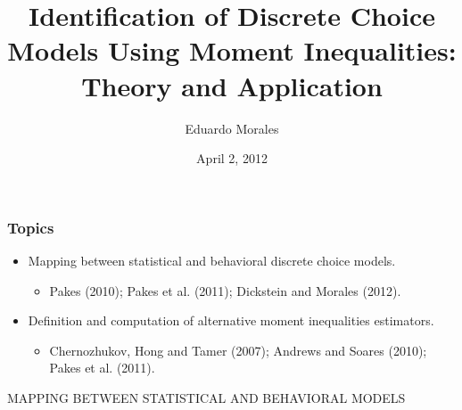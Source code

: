\title[]{Identification of Discrete Choice Models Using Moment Inequalities:\\Theory and Application}

\author[Morales] {Eduardo Morales}
\date[]{April 2, 2012}




\begin{frame}[plain]
  \titlepage
\end{frame}
\begin{frame}
\frametitle{Topics}

\begin{itemize}
	\item Mapping between statistical and behavioral discrete choice models.
	\begin{itemize}
		\item Pakes (2010); Pakes et al. (2011); Dickstein and Morales (2012).
	\end{itemize}
	\item Definition and computation of alternative moment inequalities estimators.
	\begin{itemize}
		\item Chernozhukov, Hong and Tamer (2007); Andrews and Soares (2010); Pakes et al. (2011).
	\end{itemize}
\end{itemize}
\end{frame}
\begin{frame}
\centerline{MAPPING BETWEEN STATISTICAL AND BEHAVIORAL MODELS}
\end{frame}
